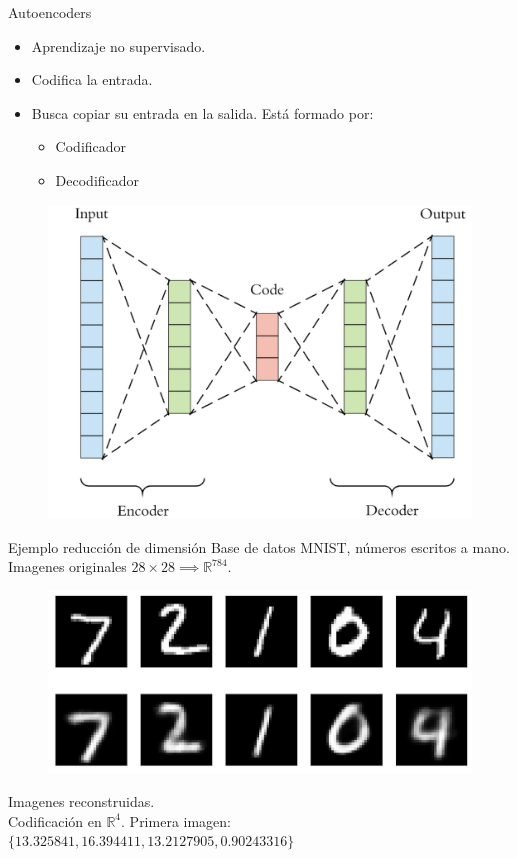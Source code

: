 \documentclass[spanish]{beamer}
\begin{document}
\begin{frame}{Autoencoders}
\begin{itemize}
\item Aprendizaje no supervisado.
\item Codifica la entrada.
\item Busca copiar su entrada en la salida. Está formado por:
  \begin{itemize}
    \item Codificador
    \item Decodificador
  \end{itemize}
\end{itemize}
\begin{figure}[h]
  \centering
  \includegraphics[width=.6\textwidth]{img/autoencoder}
\end{figure}
\end{frame}

\begin{frame}{Ejemplo reducción de dimensión}
    Base de datos MNIST, números escritos a mano.\\
  Imagenes originales $28\times28 \implies \mathbb{R}^{784}$.
\begin{figure}[h]
  \includegraphics[width=.6\textwidth]{img/autoencoder_ex1}
\end{figure}
Imagenes reconstruidas.\\

Codificación en $\mathbb{R}^4$. Primera imagen: $\{13.325841, 16.394411, 13.2127905, 0.90243316\}$
\end{frame}
\end{document}
